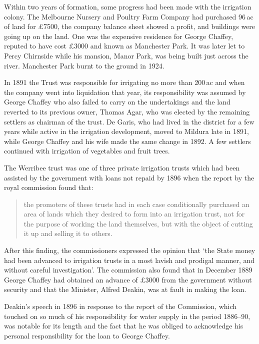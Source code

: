 Within two years of formation, some progress had been made with the
irrigation colony.  The Melbourne Nursery and Poultry Farm Company had
purchased 96\,ac of land for \pounds7500, the company balance sheet
showed a profit, and buildings were going up on the land.  One was the
expensive residence for George Chaffey, reputed to have cost
\pounds3000 and known as Manchester Park.  It was later let to Percy Chirnside while his mansion,
Manor Park, was being built just across the river.  Manchester Park
burnt to the ground in 1924.

In 1891 the Trust was responsible for irrigating no more than 200\,ac
and when the company went into liquidation that year, its
responsibility was assumed by George Chaffey who also failed to carry
on the undertakings and the land reverted to its previous owner,
Thomas Agar, who was elected by the remaining settlers as chairman of
the trust.  De Garis, who had lived in
the district for a few years while active in the irrigation
development, moved to Mildura late in 1891, while George Chaffey and
his wife made the same change in 1892.  A few settlers continued with
irrigation of vegetables and fruit trees.

The Werribee trust was one of three private irrigation trusts which
had been assisted by the government with loans not repaid by 1896 when
the report by the royal commission found that:
\begin{quote}
	the promoters of these trusts had in each case conditionally
	purchased an area of lands which they desired to form into an
	irrigation trust, not for the purpose of working the land
	themselves, but with the object of cutting it up and selling
	it to others.
\end{quote}
After this finding, the commissioners expressed the opinion that `the
State money had been advanced to irrigation trusts in a most lavish
and prodigal manner, and without careful investigation'. The commission also found that in
December 1889 George Chaffey had obtained an advance of \pounds3000
from the government without security and that the Minister, Alfred
Deakin, was at fault in making the loan.

Deakin's speech in 1896 in response to the report of the Commission,
which touched on so much of his responsibility for water supply in the
period 1886--90, was notable for its length and the fact that he was
obliged to acknowledge his personal responsibility for the loan to
George Chaffey.

